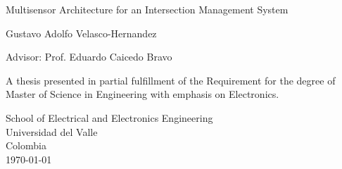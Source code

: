 \begin{titlepage}
    \begin{center}
        \vspace*{1cm}
        \Huge        
        Multisensor Architecture for an Intersection Management System
   
        \vspace{3.5cm}
        \LARGE
        Gustavo Adolfo Velasco-Hernandez
        
        \vfill
        \large
		Advisor: Prof. Eduardo Caicedo Bravo
		
		\vspace{2cm}        
        
        A thesis presented in partial fulfillment of the Requirement for the degree of Master of Science in Engineering with emphasis on Electronics.
        
        \vspace{2cm}
        
        
        School of Electrical and Electronics Engineering\\
        Universidad del Valle\\
        Colombia\\
        \today
        
    \end{center}
\end{titlepage}